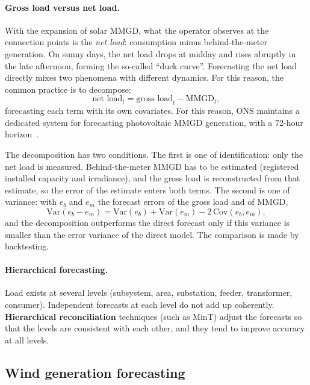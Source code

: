 \documentclass[10pt,a4paper,oneside]{article}
\begin{document}
\paragraph{Gross load versus net load.} With the expansion of solar MMGD,
what the operator observes at the connection points is the \emph{net load}:
consumption minus behind-the-meter generation. On sunny days, the net load
drops at midday and rises abruptly in the late afternoon, forming the
so-called ``duck curve''. Forecasting the net load directly mixes two
phenomena with different dynamics. For this reason, the common practice is
to decompose:
\begin{equation}
  \text{net load}_t = \text{gross load}_t - \text{MMGD}_t,
\end{equation}
forecasting each term with its own covariates. For this reason, ONS maintains
a dedicated system for forecasting photovoltaic MMGD generation, with a
72-hour horizon~\cite{onssolar}.

The decomposition has two conditions. The first is one of identification:
only the net load is measured. Behind-the-meter MMGD has to be estimated
(registered installed capacity and irradiance), and the gross load is
reconstructed from that estimate, so the error of the estimate enters both
terms. The second is one of variance: with $e_b$ and $e_m$ the forecast
errors of the gross load and of MMGD,
\begin{equation}
  \mathrm{Var}(e_b - e_m) = \mathrm{Var}(e_b) + \mathrm{Var}(e_m)
  - 2\,\mathrm{Cov}(e_b, e_m),
\end{equation}
and the decomposition outperforms the direct forecast only if this variance
is smaller than the error variance of the direct model. The comparison is
made by backtesting.

\paragraph{Hierarchical forecasting.} Load exists at several levels
(subsystem, area, substation, feeder, transformer, consumer). Independent
forecasts at each level do not add up coherently. \textbf{Hierarchical
reconciliation} techniques (such as MinT) adjust the forecasts so that the
levels are consistent with each other, and they tend to improve accuracy at
all levels.

\subsection{Wind generation forecasting}
\end{document}
